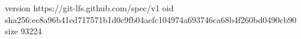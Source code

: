 version https://git-lfs.github.com/spec/v1
oid sha256:ec8a96b41ed717571b1d0c9fb04aefc104974a693746ca68b4f260bd0490cb90
size 93224
